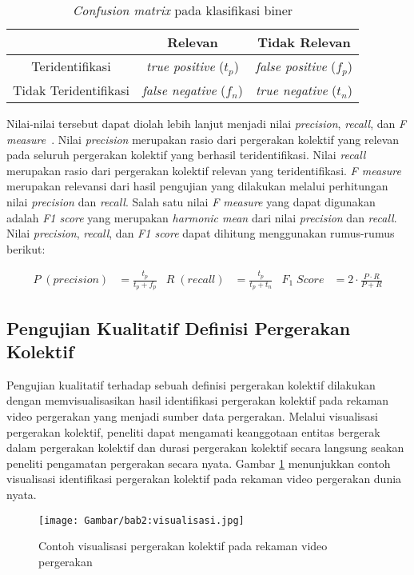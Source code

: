 \begin{table}[h]
    \centering
    \caption{\textit{Confusion matrix} pada klasifikasi biner}
    \begin{tabular}{|c|c|c|}
        \hline
         & Relevan & Tidak Relevan  \\ \hline
        Teridentifikasi & \textit{true positive} ($t_p$) & \textit{false positive} ($f_p$) \\ \hline
        Tidak Teridentifikasi & \textit{false negative} ($f_n$) & \textit{true negative} ($t_n$) \\
        \hline
    \end{tabular}
    \label{bab2:confusion}
\end{table}

Nilai-nilai tersebut dapat diolah lebih lanjut menjadi nilai \textit{precision}, \textit{recall}, dan \textit{F measure}~\cite{manning:02:ir}. Nilai \textit{precision} merupakan rasio dari pergerakan kolektif yang relevan pada seluruh pergerakan kolektif yang berhasil teridentifikasi. Nilai \textit{recall} merupakan rasio dari pergerakan kolektif relevan yang teridentifikasi. \textit{F measure} merupakan relevansi dari hasil pengujian yang dilakukan melalui perhitungan nilai \textit{precision} dan \textit{recall}. Salah satu nilai \textit{F measure} yang dapat digunakan adalah \textit{F1 score} yang merupakan \textit{harmonic mean} dari nilai \textit{precision} dan \textit{recall}. Nilai \textit{precision}, \textit{recall}, dan \textit{F1 score} dapat dihitung menggunakan rumus-rumus berikut:

\begin{align*}
    P\;(precision) & = \frac{t_p}{t_p + f_p} & R\;(recall) & = \frac{t_p}{t_p + t_n} & F_1\;Score & = 2 \cdot \frac{P \cdot R}{P + R}
\end{align*}

\subsection{Pengujian Kualitatif Definisi Pergerakan Kolektif}
\label{subsec:qualitative-theory}

Pengujian kualitatif terhadap sebuah definisi pergerakan kolektif dilakukan dengan memvisualisasikan hasil identifikasi pergerakan kolektif pada rekaman video pergerakan yang menjadi sumber data pergerakan. Melalui visualisasi pergerakan kolektif, peneliti dapat mengamati keanggotaan entitas bergerak dalam pergerakan kolektif dan durasi pergerakan kolektif secara langsung seakan peneliti pengamatan pergerakan secara nyata. Gambar \ref{bab2:visualization} menunjukkan contoh visualisasi identifikasi pergerakan kolektif pada rekaman video pergerakan dunia nyata.

\begin{figure}[h]
    \centering
    \texttt{[image: Gambar/bab2:visualisasi.jpg]}
    \caption[Contoh visualisasi pergerakan kolektif]{Contoh visualisasi pergerakan kolektif pada rekaman video pergerakan\protect\footnotemark[8]}
    \label{bab2:visualization}
\end{figure}

